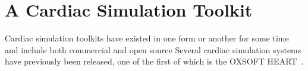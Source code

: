 \section{A Cardiac Simulation Toolkit}

Cardiac simulation toolkits have existed in one form or another for some
time and include both commercial and open source 
Several cardiac simulation systems have previously been released, one of
the first of which is the OXSOFT HEART~\cite{Noble-1999}.

